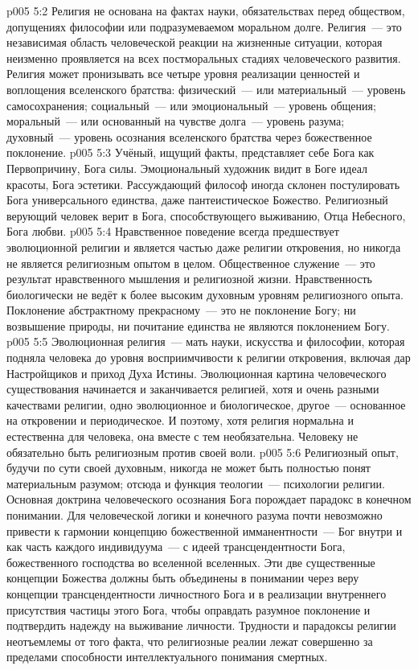 \vs p005 5:2 Религия не основана на фактах науки, обязательствах перед обществом, допущениях философии или подразумеваемом моральном долге. Религия~--- это независимая область человеческой реакции на жизненные ситуации, которая неизменно проявляется на всех постморальных стадиях человеческого развития. Религия может пронизывать все четыре уровня реализации ценностей и воплощения вселенского братства: физический~--- или материальный~--- уровень самосохранения; социальный~--- или эмоциональный~--- уровень общения; моральный~--- или основанный на чувстве долга~--- уровень разума; духовный~--- уровень осознания вселенского братства через божественное поклонение.
\vs p005 5:3 Учёный, ищущий факты, представляет себе Бога как Первопричину, Бога силы. Эмоциональный художник видит в Боге идеал красоты, Бога эстетики. Рассуждающий философ иногда склонен постулировать Бога универсального единства, даже пантеистическое Божество. Религиозный верующий человек верит в Бога, способствующего выживанию, Отца Небесного, Бога любви.
\vs p005 5:4 \pc Нравственное поведение всегда предшествует эволюционной религии и является частью даже религии откровения, но никогда не является религиозным опытом в целом. Общественное служение~--- это результат нравственного мышления и религиозной жизни. Нравственность биологически не ведёт к более высоким духовным уровням религиозного опыта. Поклонение абстрактному прекрасному~--- это не поклонение Богу; ни возвышение природы, ни почитание единства не являются поклонением Богу.
\vs p005 5:5 Эволюционная религия~--- мать науки, искусства и философии, которая подняла человека до уровня восприимчивости к религии откровения, включая дар Настройщиков и приход Духа Истины. Эволюционная картина человеческого существования начинается и заканчивается религией, хотя и очень разными качествами религии, одно эволюционное и биологическое, другое~--- основанное на откровении и периодическое. И поэтому, хотя религия нормальна и естественна для человека, она вместе с тем необязательна. Человеку не обязательно быть религиозным против своей воли.
\vs p005 5:6 \pc Религиозный опыт, будучи по сути своей духовным, никогда не может быть полностью понят материальным разумом; отсюда и функция теологии~--- психологии религии. Основная доктрина человеческого осознания Бога порождает парадокс в конечном понимании. Для человеческой логики и конечного разума почти невозможно привести к гармонии концепцию божественной имманентности~--- Бог внутри и как часть каждого индивидуума~--- с идеей трансцендентности Бога, божественного господства во вселенной вселенных. Эти две существенные концепции Божества должны быть объединены в понимании через веру концепции трансцендентности личностного Бога и в реализации внутреннего присутствия частицы этого Бога, чтобы оправдать разумное поклонение и подтвердить надежду на выживание личности. Трудности и парадоксы религии неотъемлемы от того факта, что религиозные реалии лежат совершенно за пределами способности интеллектуального понимания смертных.
